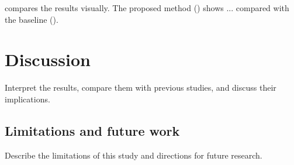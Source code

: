  compares the results visually. The proposed method () shows ... compared with the baseline ().

\section{Discussion} \label{chap4:sec2}

Interpret the results, compare them with previous studies, and discuss their implications.

\subsection{Limitations and future work} \label{chap4:sec2:subsec1}

Describe the limitations of this study and directions for future research.
